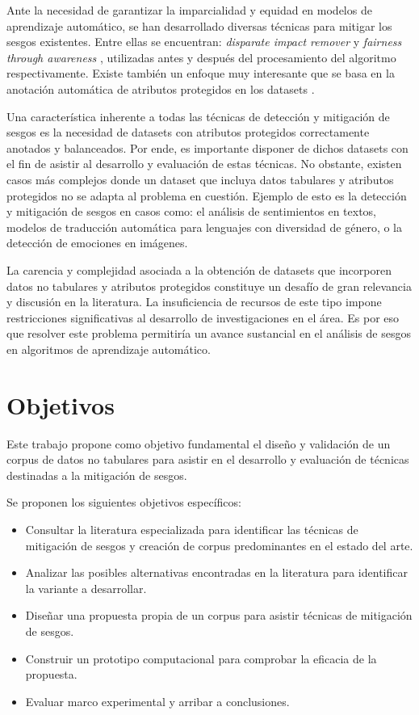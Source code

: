 Ante la necesidad de garantizar la imparcialidad y equidad en modelos de aprendizaje autom\'atico, se han desarrollado diversas t\'ecnicas 
para mitigar los sesgos existentes. Entre ellas se encuentran: \textit{disparate impact remover} \parencite{dis_impact_rem} y 
\textit{fairness through awareness} \parencite{fair_awareness}, utilizadas antes y despu\'es del procesamiento del algoritmo respectivamente. 
Existe tambi\'en un enfoque muy interesante que se basa en la anotaci\'on autom\'atica de atributos protegidos en los datasets 
\parencite{soumah2023radar,dinan2020multidimensional,10.1007/978-3-031-35320-8_39}.

Una caracter\'istica inherente a todas las t\'ecnicas de detecci\'on y mitigaci\'on de sesgos es la necesidad de datasets con atributos protegidos 
correctamente anotados y balanceados. Por ende, es importante disponer de dichos datasets con el fin de asistir al desarrollo y evaluaci\'on 
de estas t\'ecnicas. No obstante, existen casos m\'as complejos donde un dataset que incluya datos tabulares y atributos protegidos no se adapta 
al problema en cuesti\'on. Ejemplo de esto es la detecci\'on y mitigaci\'on de sesgos en casos como: el an\'alisis de sentimientos en textos, 
modelos de traducci\'on autom\'atica para lenguajes con diversidad de g\'enero, o la detecci\'on de emociones en im\'agenes. 

La carencia y complejidad asociada a la obtenci\'on de datasets que incorporen datos no tabulares y atributos protegidos constituye un 
desaf\'io de gran relevancia y discusi\'on en la literatura. La insuficiencia de recursos de este tipo impone restricciones significativas 
al desarrollo de investigaciones en el \'area. Es por eso que resolver este problema permitir\'ia un avance sustancial en el an\'alisis de 
sesgos en algoritmos de aprendizaje autom\'atico. 

\section*{Objetivos}
Este trabajo propone como objetivo fundamental el dise\~no y validaci\'on de un corpus de datos no tabulares para
asistir en el desarrollo y evaluaci\'on de t\'ecnicas destinadas a la mitigaci\'on de sesgos.

Se proponen los siguientes objetivos espec\'ificos:
\begin{itemize}
    \item Consultar la literatura especializada para identificar las t\'ecnicas de mitigaci\'on de sesgos y creaci\'on
    de corpus predominantes en el estado del arte.
    \item Analizar las posibles alternativas encontradas en la literatura para identificar la variante a desarrollar.
    \item Dise\~nar una propuesta propia de un corpus para asistir t\'ecnicas de mitigaci\'on de sesgos. 
    \item Construir un prototipo computacional para comprobar la eficacia de la propuesta.
    \item Evaluar marco experimental y arribar a conclusiones.
\end{itemize}

